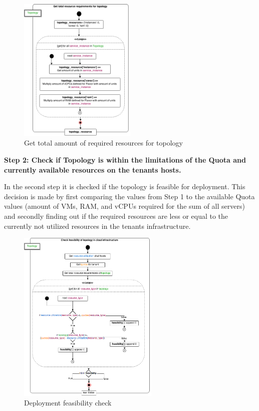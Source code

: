 \begin{figure}[H]
\centering

\includegraphics[width=0.5\textwidth]{images/implementation/cm_get_topology_requirements}

\caption{Get total amount of required resources for topology}
\end{figure}

\textbf{Step 2: Check if Topology is within the limitations of the Quota and currently available resources on the tenants hosts.}

In the second step it is checked if the topology is feasible for deployment. This decision is made by first comparing the values from Step 1 to the available Quota values (amount of VMs, RAM, and vCPUs required for the sum of all servers) and secondly finding out if the required resources are less or equal to the currently not utilized resources in the tenants infrastructure.

\begin{figure}[H]
\centering

\includegraphics[width=0.6\textwidth]{images/implementation/cm_feasibility_check}

\caption{Deployment feasibility check}
\end{figure}

